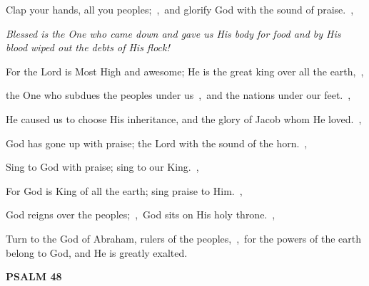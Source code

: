 \documentclass[12pt,twoside,a5paper]{article}
\newcommand{\psalm}[1]{\textbf{PSALM {#1}}\nopagebreak}
\newcommand{\qanona}[1]{{\liturgicalhint{Qanona.} \emph{#1}}}
\begin{document}
\begin{normalparskip}
  Clap your hands, all you peoples;~\sep\ and glorify God with the sound of praise.~\sep

  \qanona{Blessed is the One who came down and gave us His body for food and by His blood wiped out the debts of His flock!}

  For the Lord is Most High and awesome; He is the great king over all the earth,~\sep

  the One who subdues the peoples under us~\sep\ and the nations under our feet.~\sep

  He caused us to choose His inheritance, and the glory of Jacob whom He loved.~\sep

  God has gone up with praise; the Lord with the sound of the horn.~\sep

  Sing to God with praise; sing to our King.~\sep

  For God is King of all the earth; sing praise to Him.~\sep

  God reigns over the peoples;~\sep\ God sits on His holy throne.~\sep

  Turn to the God of Abraham, rulers of the peoples,~\sep\ for the powers of the earth belong to God, and He is greatly exalted.
\end{normalparskip}

\psalm{48}
\end{document}
